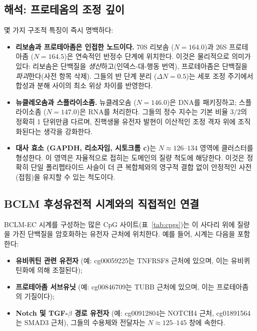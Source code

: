 \documentclass[12pt,a4paper]{article}
\begin{document}
	\subsection{해석: 프로테옴의 조정 깊이}
	
	몇 가지 구조적 특징이 즉시 명백하다:
	\begin{itemize}
		\item \textbf{리보솜과 프로테아좀은 인접한 노드이다.} 70S 리보솜 (\(N=164.0\))과 26S 프로테아좀 (\(N=164.5\))은 연속적인 반정수 단계에 위치한다. 이것은 물리적으로 의미가 있다: 리보솜은 단백질을 \emph{생산}하고(인덱스-대-행동 번역), 프로테아좀은 단백질을 \emph{파괴}한다(사전 항목 삭제). 그들의 반 단계 분리 (\(\Delta N = 0.5\))는 세포 조정 주기에서 합성과 분해 사이의 최소 위상 차이를 반영한다.
		\item \textbf{뉴클레오솜과 스플라이소좀.} 뉴클레오솜 (\(N=146.0\))은 DNA를 패키징하고; 스플라이소좀 (\(N=147.0\))은 RNA를 처리한다. 그들의 정수 지수는 기본 비율 \(3/2\)의 정확히 1 단위만큼 다르며, 진핵생물 유전자 발현이 이산적인 조정 격자 위에 조직화된다는 생각을 강화한다.
		\item \textbf{대사 효소 (GAPDH, 리소자임, 시토크롬 c)}는 \(N \approx 126\)--\(134\) 영역에 클러스터를 형성한다. 이 영역은 자율적으로 접히는 도메인의 질량 척도에 해당한다. 이것은 정확히 단일 폴리펩타이드 사슬이 더 큰 복합체와의 영구적 결합 없이 안정적인 사전(접힘)을 유지할 수 있는 척도이다.
	\end{itemize}
	
	\subsection{BCLM 후성유전적 시계와의 직접적인 연결}
	
	BCLM-EC 시계를 구성하는 많은 CpG 사이트(표~\ref{tab:cpgs})는 이 사다리 위에 질량을 가진 단백질을 암호화하는 유전자 근처에 위치한다. 예를 들어, 시계는 다음을 포함한다:
	\begin{itemize}
		\item \textbf{유비퀴틴 관련 유전자} (예: cg00059225는 TNFRSF8 근처에 있으며, 이는 유비퀴틴화에 의해 조절된다);
		\item \textbf{프로테아좀 서브유닛} (예: cg00846709는 TUBB 근처에 있으며, 이는 프로테아좀의 기질이다);
		\item \textbf{Notch 및 TGF-\(\beta\) 경로 유전자} (예: cg00912804는 NOTCH4 근처, cg01891564는 SMAD3 근처), 그들의 수용체와 전달자는 \(N \approx 125\)--\(145\) 창에 속한다.
	\end{itemize}
	
\end{document}
